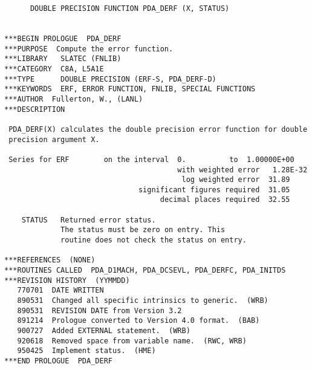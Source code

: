 

\begin{verbatim}
      DOUBLE PRECISION FUNCTION PDA_DERF (X, STATUS)


***BEGIN PROLOGUE  PDA_DERF
***PURPOSE  Compute the error function.
***LIBRARY   SLATEC (FNLIB)
***CATEGORY  C8A, L5A1E
***TYPE      DOUBLE PRECISION (ERF-S, PDA_DERF-D)
***KEYWORDS  ERF, ERROR FUNCTION, FNLIB, SPECIAL FUNCTIONS
***AUTHOR  Fullerton, W., (LANL)
***DESCRIPTION

 PDA_DERF(X) calculates the double precision error function for double
 precision argument X.

 Series for ERF        on the interval  0.          to  1.00000E+00
                                        with weighted error   1.28E-32
                                         log weighted error  31.89
                               significant figures required  31.05
                                    decimal places required  32.55

    STATUS   Returned error status.
             The status must be zero on entry. This
             routine does not check the status on entry.

***REFERENCES  (NONE)
***ROUTINES CALLED  PDA_D1MACH, PDA_DCSEVL, PDA_DERFC, PDA_INITDS
***REVISION HISTORY  (YYMMDD)
   770701  DATE WRITTEN
   890531  Changed all specific intrinsics to generic.  (WRB)
   890531  REVISION DATE from Version 3.2
   891214  Prologue converted to Version 4.0 format.  (BAB)
   900727  Added EXTERNAL statement.  (WRB)
   920618  Removed space from variable name.  (RWC, WRB)
   950425  Implement status.  (HME)
***END PROLOGUE  PDA_DERF
\end{verbatim}



